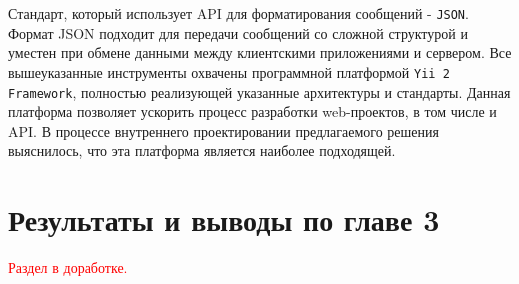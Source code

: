 	Стандарт, который использует API для форматирования сообщений - \texttt{JSON}. Формат JSON подходит для передачи сообщений со сложной структурой и уместен при обмене данными между клиентскими приложениями и сервером.
	Все вышеуказанные инструменты охвачены программной платформой \texttt{Yii 2 Framework}, полностью реализующей указанные архитектуры и стандарты. Данная платформа позволяет ускорить процесс разработки web-проектов, в том числе и API. В процессе внутреннего проектировании предлагаемого решения выяснилось, что эта платформа является наиболее подходящей.

\section{Результаты и выводы по главе 3}

\par

	\textcolor{red}{Раздел в доработке.}